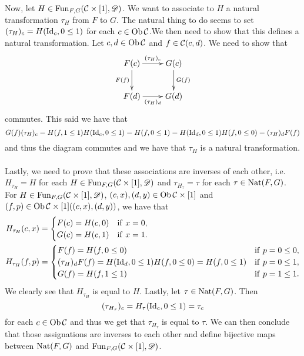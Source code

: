 \documentclass[11pt, a4paper, twoside]{article}
\begin{document}
Now, let $H\in\operatorname{Fun}_{F,G}(\mathcal{C}\times[1],\mathscr D)$. We want to associate to $H$ a natural transformation $\tau_H$ from $F$ to $G$. The natural thing to do seems to set $(\tau_H)_c=H(\mathrm{Id}_c,0\leq1)$ for each $c\in\operatorname{Ob}\mathcal{C}$.We then need to show that this defines a natural transformation. Let $c,d\in\operatorname{Ob}\mathcal{C}$ and $f\in\mathcal{C}(c,d)$. We need to show that 
	\begin{displaymath}
		\xymatrix{
			F(c) \ar[r]^{(\tau_H)_c} \ar[d]_{F(f)} & G(c) \ar[d]^{G(f)}\\
			F(d) \ar[r]_{(\tau_H)_d} & G(d)
		}
	\end{displaymath}
commutes. This said we have that 
	\begin{displaymath}
		G(f)(\tau_H)_c=H(f,1\leq1)H(\mathrm{Id}_c,0\leq1)=H(f,0\leq1)=H(\mathrm{Id}_d,0\leq1)H(f,0\leq0)=(\tau_H)_dF(f)
	\end{displaymath} 
and thus the diagram commutes and we have that $\tau_H$ is a natural transformation.\\\\
Lastly, we need to prove that these associations are inverses of each other, i.e. $H_{\tau_H}=H$ for each $H\in\operatorname{Fun}_{F,G}(\mathcal{C}\times[1],\mathscr D)$ and $\tau_{H_\tau}=\tau$ for each $\tau\in\operatorname{Nat}(F,G)$. For $H\in\operatorname{Fun}_{F,G}(\mathcal{C}\times[1],\mathscr D)$, $(c,x),(d,y)\in\operatorname{Ob}\mathcal{C}\times[1]$ and $(f,p)\in\operatorname{Ob}\mathcal{C}\times[1]((c,x),(d,y))$, we have that 
	\begin{align*}
		H_{\tau_H}(c,x) &=
			\begin{cases}
				F(c)=H(c,0) & \mathrm{if}\ x=0,\\
				G(c)=H(c,1) & \mathrm{if}\ x=1.
			\end{cases}\\
		H_{\tau_H}(f,p) &=
			\begin{cases}
				F(f) = H(f,0\leq0) & \mathrm{if}\ p=0\leq0,\\
				(\tau_H)_dF(f)=H(\mathrm{Id}_d,0\leq1)H(f,0\leq0)=H(f,0\leq1) & \mathrm{if}\ p=0\leq1,\\
				G(f)  = H(f,1\leq1) & \mathrm{if}\ p=1\leq1.
			\end{cases}
		\end{align*}
	We clearly see that $H_{\tau_H}$ is equal to $H$. Lastly, let $\tau\in\operatorname{Nat}(F,G)$. Then 
		\begin{displaymath}
			(\tau_{H_\tau})_c=H_\tau(\mathrm{Id}_c,0\leq1)=\tau_c
		\end{displaymath}
			for each $c\in\operatorname{Ob}\mathcal{C}$ and thus we get that $\tau_{H_\tau}$ is equal to $\tau$. We can then conclude that those assignations are inverses to each other and define bijective maps between $\operatorname{Nat}(F,G)$ and $\operatorname{Fun}_{F,G}(\mathcal{C}\times[1],\mathscr D)$.
	
\end{document}
